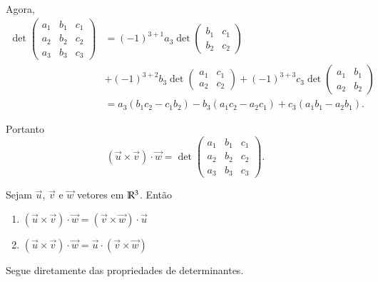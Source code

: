 Agora,
\begin{align*}
  \det \begin{pmatrix}
    a_1 & b_1 & c_1\\
    a_2 & b_2 & c_2\\
    a_3 & b_3 & c_3
  \end{pmatrix} & = (-1)^{3+1}a_3\det \begin{pmatrix}
    b_1 & c_1\\
    b_2 & c_2
  \end{pmatrix} \\ &+ (-1)^{3+2}b_3\det \begin{pmatrix}
    a_1 & c_1\\
    a_2 & c_2
  \end{pmatrix} + (-1)^{3+3}c_3\det \begin{pmatrix}
    a_1 & b_1\\
    a_2 & b_2
  \end{pmatrix}\\ &= a_3(b_1c_2 - c_1b_2) - b_3(a_1c_2 - a_2c_1) + c_3(a_1b_1 - a_2b_1).
\end{align*}

Portanto
\begin{equation}
  (\vec{u}\times\vec{v})\cdot\vec{w} = \det \begin{pmatrix}
    a_1 & b_1 & c_1\\
    a_2 & b_2 & c_2\\
    a_3 & b_3 & c_3
  \end{pmatrix}.
\end{equation}

\begin{proposicao}
  Sejam $\vec{u}$, $\vec{v}$ e $\vec{w}$ vetores em $\mathbb{R}^3$. Ent\~ao
  \begin{enumerate}[label=({\alph*})]
    \item $(\vec{u}\times\vec{v})\cdot\vec{w} = (\vec{v}\times\vec{w})\cdot\vec{u}$
    \item $(\vec{u}\times\vec{v})\cdot\vec{w} = \vec{u}\cdot(\vec{v}\times\vec{w})$
  \end{enumerate}
\end{proposicao}
\begin{prova}
  Segue diretamente das propriedades de determinantes.
\end{prova}

